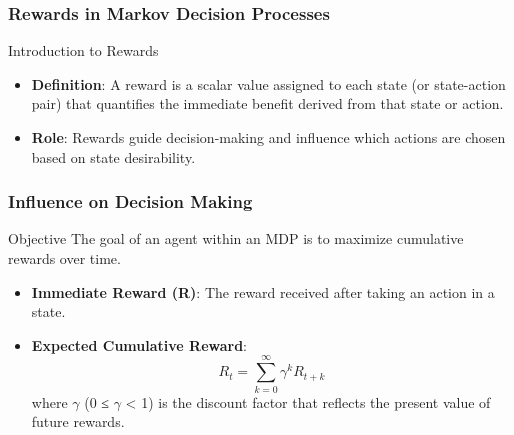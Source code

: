 \documentclass[aspectratio=169]{beamer}
\begin{document}
\begin{frame}[fragile]
    \frametitle{Rewards in Markov Decision Processes}
    \begin{block}{Introduction to Rewards}
        \begin{itemize}
            \item \textbf{Definition}: A reward is a scalar value assigned to each state (or state-action pair) that quantifies the immediate benefit derived from that state or action.
            \item \textbf{Role}: Rewards guide decision-making and influence which actions are chosen based on state desirability.
        \end{itemize}
    \end{block}
\end{frame}

\begin{frame}[fragile]
    \frametitle{Influence on Decision Making}
    \begin{block}{Objective}
        The goal of an agent within an MDP is to maximize cumulative rewards over time.
    \end{block}
    \begin{itemize}
        \item \textbf{Immediate Reward (R)}: The reward received after taking an action in a state.
        \item \textbf{Expected Cumulative Reward}:
        \begin{equation}
            R_t = \sum_{k=0}^{\infty} \gamma^k R_{t+k}
        \end{equation}
        where $\gamma$ (0 ≤ $\gamma$ < 1) is the discount factor that reflects the present value of future rewards.
    \end{itemize}
\end{frame}
\end{document}
